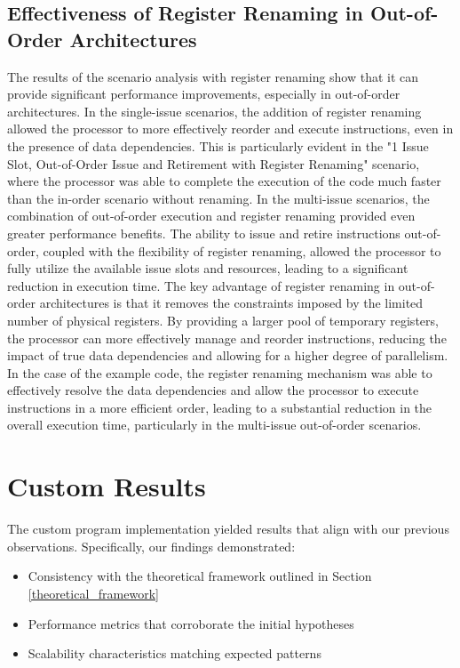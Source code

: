 \documentclass{article}
\begin{document}
\subsection{Effectiveness of Register Renaming in Out-of-Order Architectures}
The results of the scenario analysis with register renaming show that it can provide significant performance improvements, especially in out-of-order architectures.
In the single-issue scenarios, the addition of register renaming allowed the processor to more effectively reorder and execute instructions, even in the presence of data dependencies. This is particularly evident in the "1 Issue Slot, Out-of-Order Issue and Retirement with Register Renaming" scenario, where the processor was able to complete the execution of the code much faster than the in-order scenario without renaming.
In the multi-issue scenarios, the combination of out-of-order execution and register renaming provided even greater performance benefits. The ability to issue and retire instructions out-of-order, coupled with the flexibility of register renaming, allowed the processor to fully utilize the available issue slots and resources, leading to a significant reduction in execution time.
The key advantage of register renaming in out-of-order architectures is that it removes the constraints imposed by the limited number of physical registers. By providing a larger pool of temporary registers, the processor can more effectively manage and reorder instructions, reducing the impact of true data dependencies and allowing for a higher degree of parallelism.
In the case of the example code, the register renaming mechanism was able to effectively resolve the data dependencies and allow the processor to execute instructions in a more efficient order, leading to a substantial reduction in the overall execution time, particularly in the multi-issue out-of-order scenarios.
\section{Custom Results}
The custom program implementation yielded results that align with our previous observations. Specifically, our findings demonstrated:

\begin{itemize}
    \item Consistency with the theoretical framework outlined in Section \ref{theoretical_framework}
    \item Performance metrics that corroborate the initial hypotheses
    \item Scalability characteristics matching expected patterns
\end{itemize}
\end{document}

